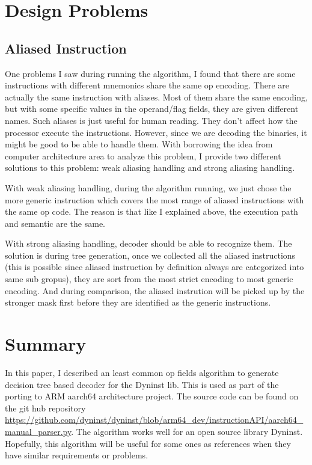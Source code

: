 \documentclass[]{article}
\begin{document}
\section{Design Problems}
\subsection{Aliased Instruction}
One problems I saw during running the algorithm, I found that there are some instructions with different mnemonics share the same op encoding. There are actually the same instruction with aliases. Most of them share the same encoding, but with some specific values in the operand/flag fields, they are given different
names. Such aliases is just useful for human reading. They don't affect how the processor execute the instructions. However, since we are decoding 
the binaries, it might be good to be able to handle them. With borrowing the idea from computer architecture area to analyze this problem\cite{WEBSITE:WikiAliasingComputing}, I provide two different solutions to this problem: weak aliasing handling and strong aliasing handling.

With weak aliasing handling, during the algorithm running, we just chose the more generic instruction which covers the most range of aliased instructions with the same op code. The reason is that like I explained above, the execution path and semantic are the same.

With strong aliasing handling, decoder should be able to recognize them. The solution is during tree generation, once we collected all the aliased 
instructions (this is possible since aliased instruction by definition always are categorized into same sub gropus), they are sort from the most 
strict encoding to most generic encoding. And during comparison, the aliased instrution will be picked up by the stronger mask first before they are
identified as the generic instructions.

\section{Summary}
In this paper, I described an least common op fields algorithm to generate decision tree based decoder for the Dyninst lib. This is used as part of the porting to
ARM aarch64 architecture project. The source code can be found on the git hub repository \url{https://github.com/dyninst/dyninst/blob/arm64_dev/instructionAPI/aarch64_manual_parser.py}. The algorithm works well
for an open source library Dyninst. Hopefully, this algorithm will be useful for some ones as references when they have similar requirements or problems.

 

\end{document}
